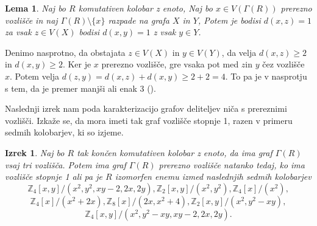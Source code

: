 \documentclass[a4paper, 12pt]{amsart}
\theoremstyle{definition} %
\theoremstyle{plain} %
\newtheorem{lema}[definicija]{Lema}
\newtheorem{izrek}[definicija]{Izrek}
\newcommand{\Z}{\mathbb Z}
\begin{document}
\begin{lema}
Naj bo $R$ komutativen kolobar z enoto, Naj bo $x\in V(\Gamma(R))$ prerezno vozlišče in naj $\Gamma(R) \setminus \{x\}$ razpade na grafa $X$ in $Y$, Potem je bodisi $d(x,z)= 1$ za vsak $z\in V(X)$ bodisi $d(x,y) = 1$ z vsak $y\in Y$.
\end{lema}

\proof
Denimo nasprotno, da obstajata $z\in V(X)$ in $y\in V(Y)$, da velja $d(x,z)\ge2$ in $d(x,y)\ge 2$. Ker je $x$ prerezno vozlišče, gre vsaka pot med $z$in $y$ čez vozlišče $x$. Potem velja $d(z,y)= d(x,z) + d(x,y) \ge 2 + 2 =4 $. To pa je v nasprotju s tem, da je premer manjši ali enak 3 (\cite{diploma}).
\endproof

Naslednji izrek nam poda karakterizacijo grafov deliteljev niča s prereznimi vozlišči. Izkaže se, da mora imeti tak graf vozlišče stopnje 1, razen v primeru sedmih kolobarjev, ki so izjeme.

\begin{izrek}
Naj bo $R$ tak končen komutativen kolobar z enoto, da ima graf $\Gamma(R)$ vsaj tri vozlišča. Potem ima graf $\Gamma(R)$ prerezno vozlišče natanko tedaj, ko ima vozlišče stopnje 1 ali pa je $R$ izomorfen enemu izmed naslednjih sedmih kolobarjev
$$
\Z_4[x,y]/(x^2, y^2, xy-2,2x,2y), \Z_2[x,y]/(x^2,y^2), \Z_4[x]/(x^2),
$$
$$
\Z_4[x]/(x^2+2x), \Z_8[x]/(2x,x^2 + 4), \Z_2[x,y]/(x^2, y^2 - xy),
$$
$$
\Z_4[x,y]/(x^2, y^2 - xy, xy-2,2x,2y).
$$
\end{izrek}
\end{document}
